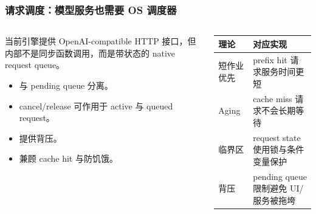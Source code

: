 \begin{frame}
  \frametitle{请求调度：模型服务也需要 OS 调度器}
  \begin{columns}[T,onlytextwidth]
    \begin{column}{0.52\textwidth}
      \small
      当前引擎提供 OpenAI-compatible HTTP 接口，但内部不是同步函数调用，而是带状态的 native request queue。

      \vspace{0.35em}
      \begin{itemize}
        \item {} 与 pending queue 分离。
        \item cancel/release 可作用于 active 与 queued request。
        \item {} 提供背压。
        \item {} 兼顾 cache hit 与防饥饿。
      \end{itemize}
    \end{column}
    \begin{column}{0.44\textwidth}
      \scriptsize
      \begin{tabularx}{\textwidth}{p{}Y}
        \toprule
        理论 & 对应实现 \\
        \midrule
        短作业优先 & prefix hit 请求服务时间更短 \\
        Aging & cache miss 请求不会长期等待 \\
        临界区 & request state 使用锁与条件变量保护 \\
        背压 & pending queue 限制避免 UI/服务被拖垮 \\
        \bottomrule
      \end{tabularx}
    \end{column}
  \end{columns}
\end{frame}

